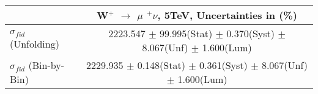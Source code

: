 \documentclass[12pt]{article}
\begin{document}
\begin{table}[ht]
\begin{tabular}{c|c|}
\cline{2-2}
                                                           &    W$^{+}$ $\rightarrow$ $\mu$ $^{+} \nu $, 5TeV, Uncertainties in (\%)  \\ \hline 
\multicolumn{1}{|l|}{$\sigma_{fid}$ (Unfolding)}         &    2223.547   $\pm$ 99.995(Stat) $\pm$ 0.370(Syst) $\pm$ 8.067(Unf) $\pm$ 1.600(Lum)     \\ \hline 
\multicolumn{1}{|l|}{$\sigma_{fid}$ (Bin-by-Bin)}        &    2229.935   $\pm$ 0.148(Stat) $\pm$ 0.361(Syst) $\pm$ 8.067(Unf) $\pm$ 1.600(Lum)     \\ \hline 
\end{tabular}
\end{table}
\end{document}
